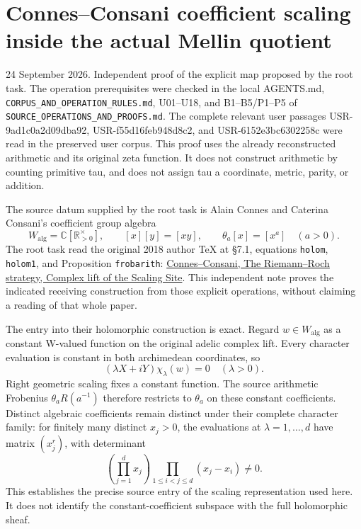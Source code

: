 \section{Connes--Consani coefficient scaling inside the actual Mellin
quotient}\label{connesconsani-coefficient-scaling-inside-the-actual-mellin-quotient}

24 September 2026. Independent proof of the explicit map proposed by the
root task. The operation prerequisites were checked in the local
AGENTS.md, \nolinkurl{CORPUS_AND_OPERATION_RULES.md}, U01--U18, and B1--B5/P1--P5
of \nolinkurl{SOURCE_OPERATIONS_AND_PROOFS.md}. The complete relevant user
passages USR-9ad1c0a2d09dba92, USR-f55d16feb948d8c2, and
USR-6152e3bc6302258c were read in the preserved user corpus. This proof
uses the already reconstructed arithmetic and its original zeta
function. It does not construct arithmetic by counting primitive tau,
and does not assign tau a coordinate, metric, parity, or addition.

The source datum supplied by the root task is Alain Connes and Caterina
Consani's coefficient group algebra \[
W_{\mathrm{alg}}=\mathbb C[\mathbb R_{>0}^{\times}],\qquad
[x][y]=[xy],\qquad \theta_a[x]=[x^a]\quad(a>0).
\tag{CW0.1}
\] The root task read the original 2018 author TeX at §7.1, equations
\texttt{holom}, \texttt{holom1}, and Proposition \texttt{frobarith}:
\href{https://arxiv.org/abs/1805.10501v1}{Connes--Consani, The
Riemann--Roch strategy, Complex lift of the Scaling Site}. This
independent note proves the indicated receiving construction from those
explicit operations, without claiming a reading of that whole paper.

The entry into their holomorphic construction is exact. Regard
\(w\in W_{\mathrm{alg}}\) as a constant W-valued function on the
original adelic complex lift. Every character evaluation is constant in
both archimedean coordinates, so \[
(\lambda X+iY)\chi_\lambda(w)=0\quad(\lambda>0).
\tag{CW0.2}
\] Right geometric scaling fixes a constant function. The source
arithmetic Frobenius \(\theta_aR(a^{-1})\) therefore restricts to
\(\theta_a\) on these constant coefficients. Distinct algebraic
coefficients remain distinct under their complete character family: for
finitely many distinct \(x_j>0\), the evaluations at
\(\lambda=1,\ldots,d\) have matrix \((x_j^r)\), with determinant \[
\left(\prod_{j=1}^d x_j\right)
\prod_{1\le i<j\le d}(x_j-x_i)\ne0.
\tag{CW0.3}
\] This establishes the precise source entry of the scaling
representation used here. It does not identify the constant-coefficient
subspace with the full holomorphic sheaf.

